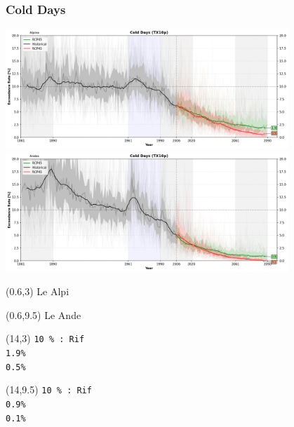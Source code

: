 
\begin{frame}
\frametitle{Cold Days}
\begin{center}

{\includegraphics[width=0.8\textwidth]{risultati/tx10p_Alpine_Models_ts_lim_20}}
{\includegraphics[width=0.8\textwidth]{risultati/tx10p_Andes_Models_ts_lim_20}}
\end{center}

{
  \scriptsize
  \begin{textblock}{1.8}(0.6,3)
     {\color{gray} Le Alpi}
  \end{textblock}
}


{
  \scriptsize
  \begin{textblock}{1.8}(0.6,9.5)
     {\color{gray} Le Ande}
  \end{textblock}
}

{ \tiny
  \begin{textblock}{3}(14,3)
     {\color{CadetBlue}  \texttt{10 \% : Rif}} \\
     {\color{ForestGreen}\texttt{1.9\%}} \\
     {\color{red}        \texttt{0.5\%}}
  \end{textblock}
}

{ \tiny
  \begin{textblock}{3}(14,9.5)
     {\color{CadetBlue}   \texttt{10 \% : Rif}} \\
     {\color{red}         \texttt{0.9\%}} \\
     {\color{ForestGreen} \texttt{0.1\%}}
  \end{textblock}
}

\end{frame}



